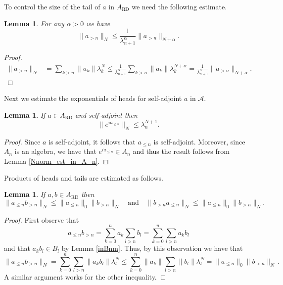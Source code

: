 \documentclass[12pt,reqno]{amsart}
\numberwithin{equation}{section}
\newtheorem{lem}[theo]{{\sc \bf Lemma}}
\begin{document}
To control the size of the tail of $a$ in $A_\textrm{RD}$ we need the following estimate.
\begin{lem}\label{lemma1}
For any $\alpha > 0$ we have
$$\|a_{> n}\|_{N} \le \dfrac{1}{\lambda_{n+1}^\alpha} \|a_{> n}\|_{N+\alpha}.$$
\end{lem}
\begin{proof}
\begin{equation*}
\begin{aligned}
\|a_{> n}\|_N &= \sum_{k>n}\|a_k\|\lambda_k^N 
\le \frac{1}{\lambda_{n+1}^\alpha}\sum_{k>n}\|a_k\| \lambda_k^{N+\alpha} = \frac{1}{\lambda_{n+1}^\alpha}\|a_{> n}\|_{N+\alpha}.
\end{aligned}
\end{equation*}
\end{proof}

Next we estimate the exponentials of heads for self-adjoint $a$ in $\mathcal{A}$.
\begin{lem}\label{lemma2}
If $a\in A_\textrm{RD}$ and self-adjoint then 
$$\|e^{ia_{\leq n}}\|_{N }\le \lambda_n^{N+1}.$$
\end{lem}
\begin{proof}
Since $a$ is self-adjoint, it follows that $a_{\le n}$ is self-adjoint.  Moreover, since $A_n$ is an algebra, we have that $e^{ia_{\le n}}\in A_n$ and thus the result follows from Lemma \ref{Nnorm_est_in_A_n}.
\end{proof}

Products of heads and tails are estimated as follows.

\begin{lem}\label{lemma3}
If $a,b\in A_\textrm{RD}$ then 
$$\|a_{\leq n}b_{> n}\|_{N} \le \|a_{\leq n}\|_{0} \|b_{> n}\|_{N}\quad\textrm{and}\quad \|b_{>n} a_{\le n}\|_{N} \le \|a_{\leq n}\|_{0} \|b_{> n}\|_{N}.$$
\end{lem}
\begin{proof}
First observe that
\begin{equation*}
a_{\le n}b_{>n}=\sum_{k=0}^na_k\sum_{l>n}b_l = \sum_{k=0}^n\sum_{l>n}a_kb_l
\end{equation*}
and that $a_kb_l\in B_l$ by Lemma \ref{inBnm}. Thus, by this observation we have that
\begin{equation*}
\|a_{\le n}b_{>n}\|_N =\sum_{k=0}^n\sum_{l>n}\|a_kb_l\|\lambda_l^N\le\sum_{k=0}^n\|a_k\|\sum_{l>n}\|b_l\|\lambda_l^N=\|a_{\le n}\|_0\|b_{>n}\|_N\,.
\end{equation*}
A similar argument works for the other inequality.
\end{proof}
\end{document}
